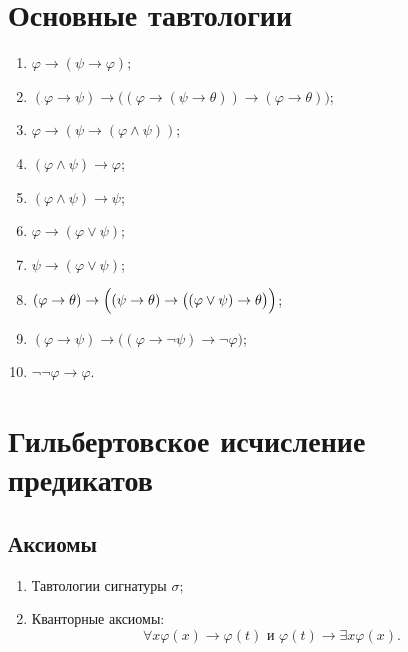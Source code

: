 \documentclass[a4paper,11pt]{article}
\begin{document}
\newpage
\section{Основные тавтологии}

\begin{enumerate}
\item $\varphi\rightarrow(\psi\rightarrow\varphi)$; 

\item $(\varphi\rightarrow\psi) \rightarrow \bigl((\varphi\rightarrow (\psi
\rightarrow \theta))\rightarrow
(\varphi \rightarrow\theta)\bigr)$;
\medskip

\item $\varphi \rightarrow (\psi\rightarrow (\varphi \land \psi))$;

\item $(\varphi
\land \psi)\rightarrow \varphi$;

\item $(\varphi \land \psi) \rightarrow\psi$; 
\medskip

\item $\varphi
\rightarrow
(\varphi \lor \psi)$;

\item $\psi \rightarrow (\varphi \lor \psi)$;

\item $(\varphi
\rightarrow \theta) \rightarrow \Bigl((\psi \rightarrow \theta)
\rightarrow \bigl((\varphi \lor \psi) \rightarrow
\theta\bigr)\Bigr)$;
\medskip

\item $(\varphi \rightarrow \psi) \rightarrow \bigl((\varphi \rightarrow
\neg\psi) \rightarrow \neg\varphi\bigr)$; 

\item $\neg\neg\varphi\rightarrow \varphi$.
\end{enumerate}


\section{Гильбертовское исчисление предикатов}

\subsection{Аксиомы}

\begin{enumerate}
	\item Тавтологии сигнатуры $\sigma$;

	\item Кванторные аксиомы:
\[ \forall x \varphi(x)\rightarrow \varphi(t) \text{\ \ и\ \ } \varphi(t)\rightarrow \exists x \varphi(x). \]
\end{enumerate}
\end{document}
